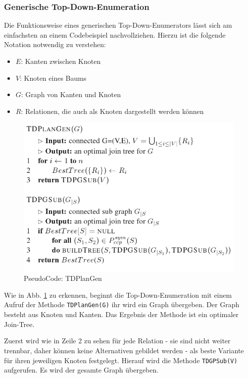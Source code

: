 \subsubsection{Generische Top-Down-Enumeration}

Die Funktionsweise eines generischen Top-Down-Enumerators lässt sich am einfachsten an einem Codebeispiel nachvollziehen. Hierzu ist die folgende Notation notwendig zu verstehen:

\begin{itemize}
\item $E$: Kanten zwischen Knoten
\item $V$: Knoten eines Baums
\item $G$: Graph von Kanten und Knoten
\item $R$: Relationen, die auch als Knoten dargestellt werden können
\end{itemize}


\begin{figure}[ht]
  \centering
  \includegraphics[scale=0.4]{03_Regeln/00_media/TDPlanGen.png}
  \caption{PseudoCode: TDPlanGen}
  \label{TDPlanGen}
\end{figure}


Wie in Abb. \ref{TDPlanGen} zu erkennen, beginnt die Top-Down-Enumeration mit einem Aufruf der Methode \texttt{TDPlanGen(G)} ihr wird ein Graph übergeben. Der Graph besteht aus Knoten und Kanten. Das Ergebnis der Methode ist ein optimaler Join-Tree.

Zuerst wird wie in Zeile 2 zu sehen für jede Relation - sie sind nicht weiter trennbar, daher können keine Alternativen gebildet werden - als beste Variante für ihren jeweiligen Knoten festgelegt. Hierauf wird die Methode \texttt{TDGPSub(V)} aufgerufen. Es wird der gesamte Graph übergeben.


